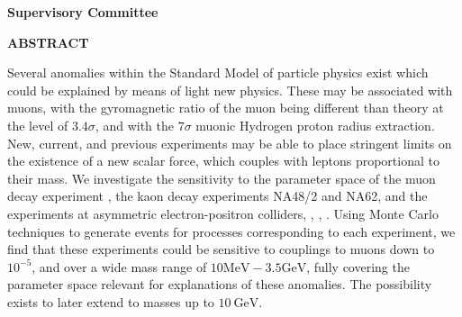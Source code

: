 \newpage
{}

\noindent \textbf{Supervisory Committee}
\tpbreak
\panel

\begin{center}
\textbf{ABSTRACT}
\end{center}

Several anomalies within the Standard Model of particle physics exist which could be explained by means of light new physics.
These may be associated with muons, with the gyromagnetic ratio of the muon being different than theory at the level of $3.4\sigma$, and with the $7\sigma$ muonic Hydrogen proton radius extraction.
New, current, and previous experiments may be able to place stringent limits on the existence of a new scalar force, which couples with leptons proportional to their mass.
We investigate the sensitivity to the parameter space of the muon decay experiment \mueee, the kaon decay experiments NA48/2 and NA62, and the experiments at asymmetric electron-positron colliders, \babar, \belle, \belletwo.
Using Monte Carlo techniques to generate events for processes corresponding to each experiment, we find that these experiments could be sensitive to couplings to muons down to $10^{-5}$, and over a wide mass range of $10\textrm{MeV} - 3.5\textrm{GeV}$, fully covering the parameter space relevant for explanations of these anomalies.
The possibility exists to later extend to masses up to $10~\textrm{GeV}$.
